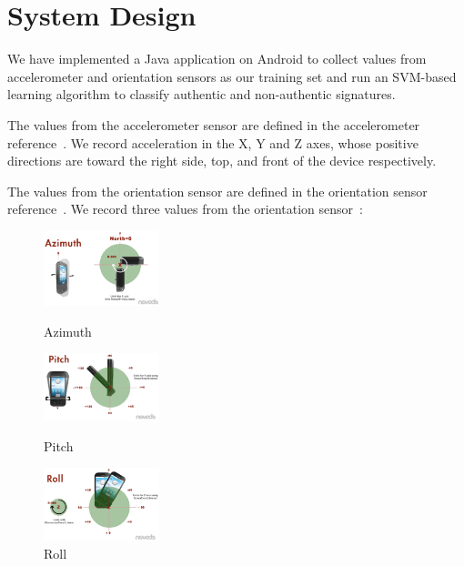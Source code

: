 \documentclass[12pt]{article}
\begin{document}
\section{System Design}

We have implemented a Java application on Android to collect values from accelerometer and orientation sensors as our training set and run an SVM-based learning algorithm to classify authentic and non-authentic signatures.

The values from the accelerometer sensor are defined in the accelerometer reference~\cite{}. We record acceleration in the X, Y and Z axes, whose positive directions are toward the right side, top, and front of the device respectively.

The values from the orientation sensor are defined in the orientation sensor reference~\cite{}.
We record three values from the orientation sensor~\cite{}:

\begin{figure}[ht]
\begin{minipage}[b]{0.33\textwidth}
\centering
\includegraphics[width=0.3\textwidth]{azimuth}
\caption{Azimuth}
\label{fig:azimuth}
\end{minipage}
\begin{minipage}[b]{0.33\textwidth}
\centering
\includegraphics[width=0.3\textwidth]{pitch}
\caption{Pitch}
\label{fig:pitch}
\end{minipage}
\begin{minipage}[b]{0.33\textwidth}
\centering
\includegraphics[width=0.3\textwidth]{roll}
\caption{Roll}
\label{fig:roll}
\end{minipage}
\end{figure}
\end{document}
